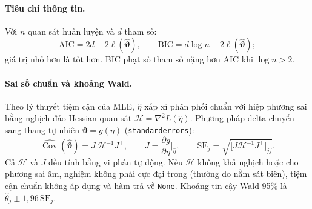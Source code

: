 \documentclass[11pt,a4paper]{article}
\renewcommand{\_}{\gachduoi\allowbreak}
\newcommand{\tep}[1]{\texttt{#1}}
\newcommand{\ham}[1]{\texttt{#1}}
\newcommand{\btheta}{\boldsymbol\vartheta}
\begin{document}
\paragraph{Tiêu chí thông tin.} Với $n$ quan sát huấn luyện và $d$ tham số:
\begin{equation}
\mathrm{AIC}=2d-2\ell(\hat{\btheta}),\qquad \mathrm{BIC}=d\log n-2\ell(\hat{\btheta});
\end{equation}
giá trị nhỏ hơn là tốt hơn. BIC phạt số tham số nặng hơn AIC khi $\log n>2$.

\paragraph{Sai số chuẩn và khoảng Wald.} Theo lý thuyết tiệm cận của MLE, $\hat\eta$ xấp xỉ phân phối chuẩn với hiệp phương sai bằng nghịch đảo Hessian quan sát $\mathcal H=\nabla^2L(\hat\eta)$. Phương pháp delta chuyển sang thang tự nhiên $\btheta=g(\eta)$ (\ham{standard\_errors}):
\begin{equation}\label{eq:delta}
\widehat{\operatorname{Cov}}(\hat{\btheta})=J\,\mathcal H^{-1}J^{\!\top},\qquad J=\frac{\partial g}{\partial\eta}\Big|_{\hat\eta},\qquad
\mathrm{SE}_j=\sqrt{\bigl[J\mathcal H^{-1}J^{\!\top}\bigr]_{jj}} .
\end{equation}
Cả $\mathcal H$ và $J$ đều tính bằng vi phân tự động. Nếu $\mathcal H$ không khả nghịch hoặc cho phương sai âm, nghiệm không phải cực đại trong (thường do nằm sát biên), tiệm cận chuẩn không áp dụng và hàm trả về \tep{None}. Khoảng tin cậy Wald 95\% là $\hat\theta_j\pm1{,}96\,\mathrm{SE}_j$.
\end{document}
